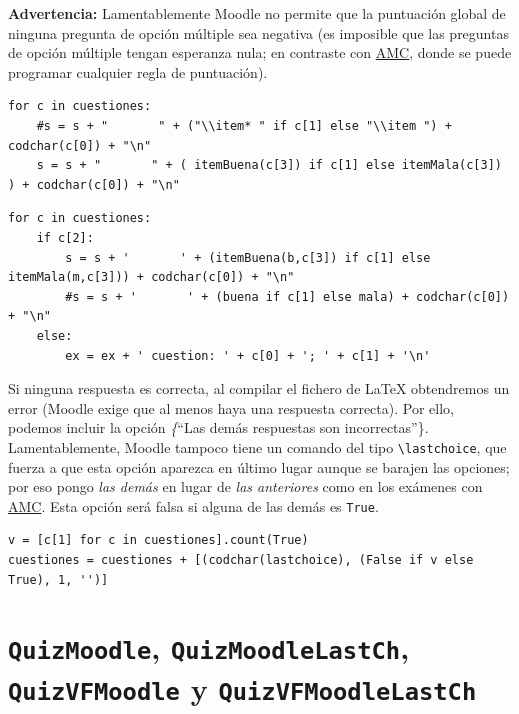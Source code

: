 \documentclass[10pt,a4paper]{report}
\begin{document}
\textbf{Advertencia:} Lamentablemente Moodle no permite que la
puntuación global de ninguna pregunta de opción múltiple sea negativa
(es imposible que las preguntas de opción múltiple tengan esperanza
nula; en contraste con
\href{https://www.auto-multiple-choice.net/}{AMC}, donde se puede
programar cualquier regla de puntuación).

\begin{verbatim}
for c in cuestiones:
    #s = s + "       " + ("\\item* " if c[1] else "\\item ") + codchar(c[0]) + "\n"
    s = s + "       " + ( itemBuena(c[3]) if c[1] else itemMala(c[3]) ) + codchar(c[0]) + "\n"
\end{verbatim}

\begin{verbatim}
for c in cuestiones:
    if c[2]: 
        s = s + '       ' + (itemBuena(b,c[3]) if c[1] else itemMala(m,c[3])) + codchar(c[0]) + "\n"
        #s = s + '       ' + (buena if c[1] else mala) + codchar(c[0]) + "\n"
    else:
        ex = ex + ' cuestion: ' + c[0] + '; ' + c[1] + '\n'
\end{verbatim}

Si ninguna respuesta es correcta, al compilar el fichero de \LaTeX{}
obtendremos un error (Moodle exige que al menos haya una respuesta
correcta). Por ello, podemos incluir la opción \emph\{``Las demás
  respuestas son incorrectas''\}. Lamentablemente, Moodle tampoco tiene
un comando del tipo \texttt{\textbackslash{}lastchoice}, que fuerza a que esta opción
aparezca en último lugar aunque se barajen las opciones; por eso pongo
\emph{las demás} en lugar de \emph{las anteriores} como en los exámenes
con \href{https://www.auto-multiple-choice.net/}{AMC}. Esta opción
será falsa si alguna de las demás es \texttt{True}.

\label{cuestion alternativa por defecto para Moodle}
\begin{verbatim}
v = [c[1] for c in cuestiones].count(True)
cuestiones = cuestiones + [(codchar(lastchoice), (False if v else True), 1, '')]
\end{verbatim}
\section{\texttt{QuizMoodle}, \texttt{QuizMoodleLastCh}, \texttt{QuizVFMoodle} y \texttt{QuizVFMoodleLastCh}}
\label{sec:org68597c4}
\end{document}
